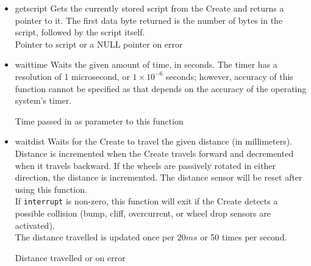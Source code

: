 \documentclass {article}
\begin{document}
\begin {itemize}
   \item {} {getscript}
         Gets the currently stored script from the Create and returns a pointer to it.  The first
         data byte returned is the number of bytes in the script, followed by the script itself. \\
         \ret Pointer to script or a NULL pointer on error

   \item {} {waittime}
         Waits the given amount of time, in seconds.  The timer has a resolution of 1 microsecond,
         or $1\times 10^{-6}$ seconds; however, accuracy of this function cannot be specified as
         that depends on the accuracy of the operating system's timer. \\
         \ret Time passed in as parameter to this function

   \item {} {waitdist}
         Waits for the Create to travel the given distance (in millimeters).  Distance is
         incremented when the Create travels forward and decremented when it travels backward.  If
         the wheels are passively rotated in either direction, the distance is incremented.  The
         distance sensor will be reset after using this function. \\
         If {\tt interrupt} is non-zero, this function will exit if the Create detects a possible
         collision (bump, cliff, overcurrent, or wheel drop sensors are activated). \\
         The distance travelled is updated once per $20ms$ or 50 times per second. \\
         \ret Distance travelled or \fail on error


\end{itemize}
\end{document}
